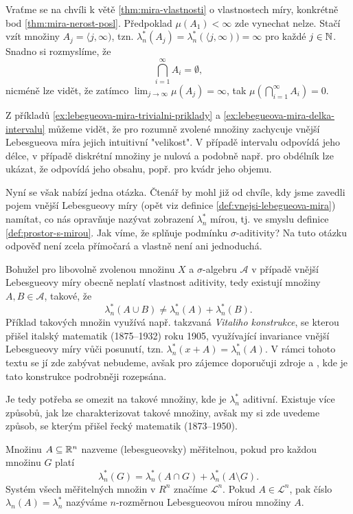 \begin{remark}
    Vraťme se na chvíli k větě \ref{thm:mira-vlastnosti} o vlastnostech míry, konkrétně bod \ref{thm:mira-nerost-posl}. Předpoklad $\mu(A_1)<\infty$ zde vynechat nelze. Stačí vzít množiny $A_j=\langle j,\infty)$, tzn. $\lambda_n^*(A_j)=\lambda_n^*(\langle j,\infty))=\infty$ pro každé $j\in\mathbb{N}$. Snadno si rozmyslíme, že
    \[\bigcap_{i=1}^\infty A_i=\emptyset,\]
    nicméně lze vidět, že zatímco $\lim_{j\to\infty}\mu(A_j)=\infty$, tak $\mu(\bigcap_{i=1}^\infty A_i)=0$.
\end{remark}

Z příkladů \ref{ex:lebegueova-mira-trivialni-priklady} a \ref{ex:lebegueova-mira-delka-intervalu} můžeme vidět, že pro rozumně zvolené množiny zachycuje vnější Lebesgueova míra jejich intuitivní "velikost". V případě intervalu odpovídá jeho délce, v případě diskrétní množiny je nulová a podobně např. pro obdélník lze ukázat, že odpovídá jeho obsahu, popř. pro kvádr jeho objemu.

Nyní se však nabízí jedna otázka. Čtenář by mohl již od chvíle, kdy jsme zavedli pojem vnější Lebesgueovy míry (opět viz definice \ref{def:vnejsi-lebegueova-mira}) namítat, co nás opravňuje nazývat zobrazení $\lambda_n^*$ mírou, tj. ve smyslu definice \ref{def:prostor-s-mirou}. Jak víme, že splňuje podmínku $\sigma$-aditivity? Na tuto otázku odpověď není zcela přímočará a vlastně není ani jednoduchá.

Bohužel pro libovolně zvolenou množinu $X$ a $\sigma$-algebru $\mathcal{A}$ v případě vnější Lebesgueovy míry obecně neplatí vlastnost aditivity, tedy existují množiny $A,B\in\mathcal{A}$, takové, že
\[\lambda_n^*(A\cup B)\neq\lambda_n^*(A)+\lambda_n^*(B).\]
Příklad takových množin využívá např. takzvaná \emph{Vitaliho konstrukce}, se kterou přišel italský matematik  (1875--1932) roku 1905, využívající invariance vnější Lebesgueovy míry vůči posunutí, tzn. $\lambda_n^*(x+A)=\lambda_n^*(A)$. \cite{OConnor2025} V rámci tohoto textu se jí zde zabývat nebudeme, avšak pro zájemce doporučuji zdroje \citep[str. 3]{Lukes2013} a \cite{Verner2025}, kde je tato konstrukce podrobněji rozepsána.

Je tedy potřeba se omezit na takové množiny, kde je $\lambda_n^*$ aditivní. Existuje více způsobů, jak lze charakterizovat takové množiny, avšak my si zde uvedeme způsob, se kterým přišel řecký matematik  (1873--1950).
\begin{definition}\label{def:lebesgueovska-meritelnost}
    Množinu $A\subseteq\mathbb{R}^n$ nazveme (lebesgueovsky) měřitelnou, pokud pro každou množinu $G$ platí
    \[\lambda_n^*(G)=\lambda_n^*(A\cap G)+\lambda_n^*(A\setminus G).\]
    Systém všech měřitelných množin v $R^n$ značíme $\mathcal{L}^n$.  Pokud $A\in\mathcal{L}^n$, pak číslo $\lambda_n(A)=\lambda_n^*$ nazýváme $n$-rozměrnou Lebesgueovou mírou množiny $A$.
\end{definition}

